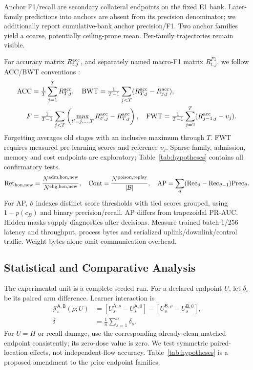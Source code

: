 \documentclass[10pt,a4paper]{article}
\begin{document}
Anchor F1/recall are secondary collateral endpoints on the fixed E1 bank. Later-family predictions into anchors are absent from its precision denominator; we additionally report cumulative-bank anchor precision/F1. Two anchor families yield a coarse, potentially ceiling-prone mean. Per-family trajectories remain visible.

For accuracy matrix $R^{\rm acc}_{t,j}$, and separately named macro-F1 matrix $R^{F1}_{t,j}$, we follow ACC/BWT conventions \cite{gem,clmetrics}:
\begin{equation}
\begin{aligned}
\mathrm{ACC}&=\tfrac1T\sum_{j=1}^TR^{\rm acc}_{T,j},\quad
\mathrm{BWT}=\tfrac1{T-1}\sum_{j<T}(R^{\rm acc}_{T,j}-R^{\rm acc}_{j,j}),\\
F&=\tfrac1{T-1}\sum_{j<T}\left(\max_{t'=j,\ldots,T}R^{\rm acc}_{t',j}-R^{\rm acc}_{T,j}\right),\quad
\mathrm{FWT}=\tfrac1{T-1}\sum_{j=2}^T(R^{\rm acc}_{j-1,j}-\upsilon_j).
\end{aligned}
\label{eq:continual}
\end{equation}
Forgetting averages old stages with an inclusive maximum through $T$. FWT requires measured pre-learning scores and reference $\upsilon_j$. Sparse-family, admission, memory and cost endpoints are exploratory; Table~\ref{tab:hypotheses} contains all confirmatory tests.
\begin{equation}
\mathrm{Ret}_{\rm hon,new}=\frac{N^{\rm adm,hon,new}}{N^{\rm elig,hon,new}},\quad
\mathrm{Cont}=\frac{N^{\rm poison,replay}}{|\mathcal B|},\quad
\mathrm{AP}=\sum_\vartheta(\mathrm{Rec}_\vartheta-\mathrm{Rec}_{\vartheta-1})\mathrm{Prec}_\vartheta.
\label{eq:diagnostics}
\end{equation}
For AP, $\vartheta$ indexes distinct score thresholds with tied scores grouped, using $1-p(c_B)$ and binary precision/recall. AP differs from trapezoidal PR-AUC. Hidden masks supply diagnostics after decisions. Measure trained batch-1/256 latency and throughput, process bytes and serialized uplink/downlink/control traffic. Weight bytes alone omit communication overhead.

\subsection{Statistical and Comparative Analysis}
The experimental unit is a complete seeded run. For a declared endpoint $U$, let $\delta_s$ be its paired arm difference. Learner interaction is
\begin{equation}
\begin{aligned}
\mathcal J_s^{\mathsf A,\mathsf B}(\rho;U)&=[U_s^{\mathsf A,\rho}-U_s^{\mathsf A,0}]-[U_s^{\mathsf B,\rho}-U_s^{\mathsf B,0}],\\
\bar\delta&=\tfrac1n\sum_{s=1}^n\delta_s.
\end{aligned}
\label{eq:interaction}
\end{equation}
For $U=H$ or recall damage, use the corresponding already-clean-matched endpoint consistently; its zero-dose value is zero. We test symmetric paired-location effects, not independent-flow accuracy. Table~\ref{tab:hypotheses} is a proposed amendment to the prior endpoint families.
\end{document}
